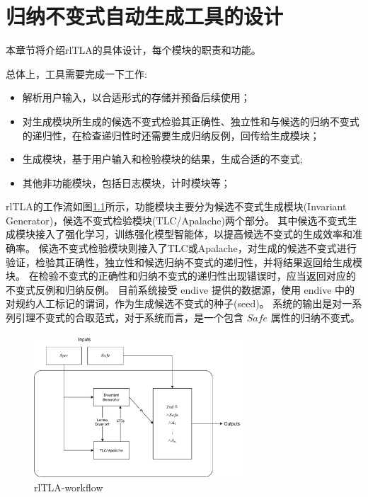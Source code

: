 \chapter{归纳不变式自动生成工具的设计}\label{chap:design}

本章节将介绍rlTLA的具体设计，每个模块的职责和功能。

总体上，工具需要完成一下工作:
\begin{itemize}
    \item 解析用户输入，以合适形式的存储并预备后续使用；
    \item 对生成模块所生成的候选不变式检验其正确性、独立性和与候选的归纳不变式的递归性，在检查递归性时还需要生成归纳反例，回传给生成模块；
    \item 生成模块，基于用户输入和检验模块的结果，生成合适的不变式;
    \item 其他非功能模块，包括日志模块，计时模块等；
\end{itemize}

rlTLA的工作流如图\ref{fig:rltla}所示，功能模块主要分为候选不变式生成模块(Invariant Generator)，候选不变式检验模块(TLC/Apalache)两个部分。
其中候选不变式生成模块接入了强化学习，训练强化模型智能体，以提高候选不变式的生成效率和准确率。
候选不变式检验模块则接入了TLC或Apalache，对生成的候选不变式进行验证，检验其正确性，独立性和候选归纳不变式的递归性，并将结果返回给生成模块。
在检验不变式的正确性和归纳不变式的递归性出现错误时，应当返回对应的不变式反例和归纳反例。
目前系统接受 endive 提供的数据源，使用 endive 中的对规约人工标记的谓词，作为生成候选不变式的种子(seed)。
系统的输出是对一系列引理不变式的合取范式，对于系统而言，是一个包含 $Safe$ 属性的归纳不变式。

\begin{figure}[h]
    \centering
    \includegraphics[width=0.7\textwidth]{figures/workflow.pdf}
    \caption{rlTLA-workflow}
    \label{fig:rltla}
\end{figure}

